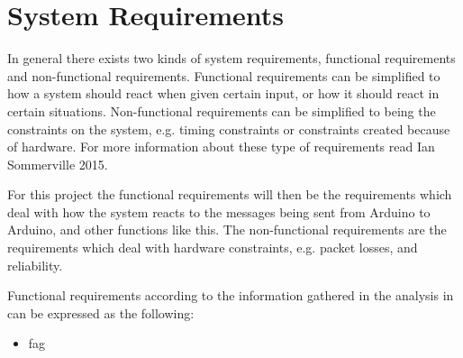 \chapter{System Requirements}
In general there exists two kinds of system requirements, functional requirements and non-functional requirements.
Functional requirements can be simplified to how a system should react when given certain input, or how it should react in certain situations.
Non-functional requirements can be simplified to being the constraints on the system, e.g. timing constraints or constraints created because of hardware.
For more information about these type of requirements read Ian Sommerville 2015. \cite{SEBook}

For this project the functional requirements will then be the requirements which deal with how the system reacts to the messages being sent from Arduino to Arduino, and other functions like this.
The non-functional requirements are the requirements which deal with hardware constraints, e.g. packet losses, and reliability.

Functional requirements according to the information gathered in the analysis in  can be expressed as the following:

\begin{itemize}
\item fag
\end{itemize}

